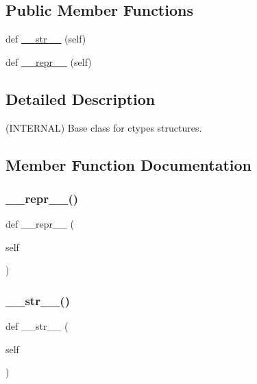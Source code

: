 \subsection*{Public Member Functions}
\begin{DoxyCompactItemize}
\item 
def \hyperlink{classvlc_1_1___cstruct_a23e8041ce1015febe4fdace3225714f9}{\+\_\+\+\_\+str\+\_\+\+\_\+} (self)
\item 
def \hyperlink{classvlc_1_1___cstruct_a9a47563093dfc5ba12274b66e368920c}{\+\_\+\+\_\+repr\+\_\+\+\_\+} (self)
\end{DoxyCompactItemize}


\subsection{Detailed Description}
\begin{DoxyVerb}(INTERNAL) Base class for ctypes structures.
\end{DoxyVerb}
 

\subsection{Member Function Documentation}
\mbox{\label{classvlc_1_1___cstruct_a9a47563093dfc5ba12274b66e368920c}} 
\subsubsection{\texorpdfstring{\+\_\+\+\_\+repr\+\_\+\+\_\+()}{\_\_repr\_\_()}}
{\footnotesize\ttfamily def \+\_\+\+\_\+repr\+\_\+\+\_\+ (\begin{DoxyParamCaption}\item[{}]{self }\end{DoxyParamCaption})}

\mbox{\label{classvlc_1_1___cstruct_a23e8041ce1015febe4fdace3225714f9}} 
\subsubsection{\texorpdfstring{\+\_\+\+\_\+str\+\_\+\+\_\+()}{\_\_str\_\_()}}
{\footnotesize\ttfamily def \+\_\+\+\_\+str\+\_\+\+\_\+ (\begin{DoxyParamCaption}\item[{}]{self }\end{DoxyParamCaption})}

